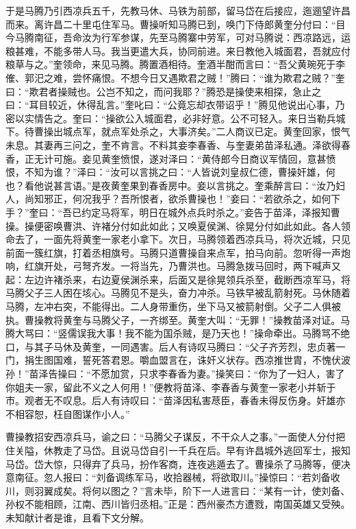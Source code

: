于是马腾乃引西凉兵五千，先教马休、马铁为前部，留马岱在后接应，迤逦望许昌而来。离许昌二十里屯住军马。曹操听知马腾已到，唤门下侍郎黄奎分付曰：“目今马腾南征，吾命汝为行军参谋，先至马腾寨中劳军，可对马腾说：西凉路远，运粮甚难，不能多带人马。我当更遣大兵，协同前进。来日教他入城面君，吾就应付粮草与之。”奎领命，来见马腾。腾置酒相待。奎酒半酣而言曰：“吾父黄琬死于李傕、郭汜之难，尝怀痛恨。不想今日又遇欺君之贼！”腾曰：“谁为欺君之贼？”奎曰：“欺君者操贼也。公岂不知之，而问我耶？”腾恐是操使来相探，急止之曰：“耳目较近，休得乱言。”奎叱曰：“公竟忘却衣带诏乎！”腾见他说出心事，乃密以实情告之。奎曰：“操欲公入城面君，必非好意。公不可轻入。来日当勒兵城下。待曹操出城点军，就点军处杀之，大事济矣。”二人商议已定。黄奎回家，恨气未息。其妻再三问之，奎不肯言。不料其妾李春香、与奎妻弟苗泽私通。泽欲得春香，正无计可施。妾见黄奎愤恨，遂对泽曰：“黄侍郎今日商议军情回，意甚愤恨，不知为谁？”泽曰：“汝可以言挑之曰：“人皆说刘皇叔仁德，曹操奸雄，何也？看他说甚言语。”是夜黄奎果到春香房中。妾以言挑之。奎乘醉言曰：“汝乃妇人，尚知邪正，何况我乎？吾所恨者，欲杀曹操也！”妾曰：“若欲杀之，如何下手？”奎曰：“吾已约定马将军，明日在城外点兵时杀之。”妾告于苗泽，泽报知曹操。操便密唤曹洪、许褚分付如此如此；又唤夏侯渊、徐晃分付如此如此。各人领命去了，一面先将黄奎一家老小拿下。次日，马腾领着西凉兵马，将次近城，只见前面一簇红旗，打着丞相旗号。马腾只道曹操自来点军，拍马向前。忽听得一声炮响，红旗开处，弓弩齐发。一将当先，乃曹洪也。马腾急拨马回时，两下喊声又起：左边许褚杀来，右边夏侯渊杀来，后面又是徐晃领兵杀至，截断西凉军马，将马腾父子三人困在垓心。马腾见不是头，奋力冲杀。马铁早被乱箭射死。马休随着马腾，左冲右突，不能得出。二人身带重伤，坐下马又被箭射倒。父子二人俱被执。曹操教将黄奎与马腾父子，一齐绑至。黄奎大叫：“无罪！”操教苗泽对证。马腾大骂曰：“竖儒误我大事！我不能为国杀贼，是乃天也！”操命牵出。马腾骂不绝口，与其子马休及黄奎，一同遇害。后人有诗叹马腾曰：“父子齐芳烈，忠贞著一门，捐生图国难，誓死答君恩。嚼血盟言在，诛奸义状存。西凉推世胄，不愧伏波孙！”苗泽告操曰：“不愿加赏，只求李春香为妻。”操笑曰：“你为了一妇人，害了你姐夫一家，留此不义之人何用！”便教将苗泽、李春香与黄奎一家老小并斩于市。观者无不叹息。后人有诗叹曰：“苗泽因私害荩臣，春香未得反伤身。奸雄亦不相容恕，枉自图谋作小人。”

曹操教招安西凉兵马，谕之曰：“马腾父子谋反，不干众人之事。”一面使人分付把住关隘，休教走了马岱。且说马岱自引一千兵在后。早有许昌城外逃回军士，报知马岱。岱大惊，只得弃了兵马，扮作客商，连夜逃遁去了。曹操杀了马腾等，便决意南征。忽人报曰：“刘备调练军马，收拾器械，将欲取川。”操惊曰：“若刘备收川，则羽翼成矣。将何以图之？”言未毕，阶下一人进言曰：“某有一计，使刘备、孙权不能相顾，江南、西川皆归丞相。”正是：西州豪杰方遭戮，南国英雄又受殃。未知献计者是谁，且看下文分解。